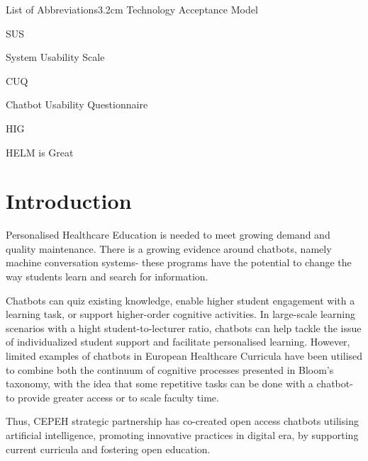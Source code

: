 \documentclass[a4paper, nobind]{templates/ociamthesis}
\begin{document}
\begin{romanpages}
\begin{mclistof}{List of Abbreviations}{3.2cm}
Technology Acceptance Model

\item[SUS]

System Usability Scale

\item[CUQ]

Chatbot Usability Questionnaire

\item[HIG]

HELM is Great

\end{mclistof} 


\end{romanpages}

\flushbottom

\hypertarget{introduction}{%
\chapter*{Introduction}\label{introduction}}

\adjustmtc
{}

Personalised Healthcare Education is needed to meet growing demand and quality maintenance.
There is a growing evidence around chatbots, namely machine conversation systems- these programs have the potential to change the way students learn and search for information.

Chatbots can quiz existing knowledge, enable higher student engagement with a learning task, or support higher-order cognitive activities.
In large-scale learning scenarios with a hight student-to-lecturer ratio, chatbots can help tackle the issue of individualized student support and facilitate personalised learning.
However, limited examples of chatbots in European Healthcare Curricula have been utilised to combine both the continuum of cognitive processes presented in Bloom's taxonomy, with the idea that some repetitive tasks can be done with a chatbot- to provide greater access or to scale faculty time.

Thus, CEPEH strategic partnership has co-created open access chatbots utilising artificial intelligence, promoting innovative practices in digital era, by supporting current curricula and fostering open education.
\end{document}
